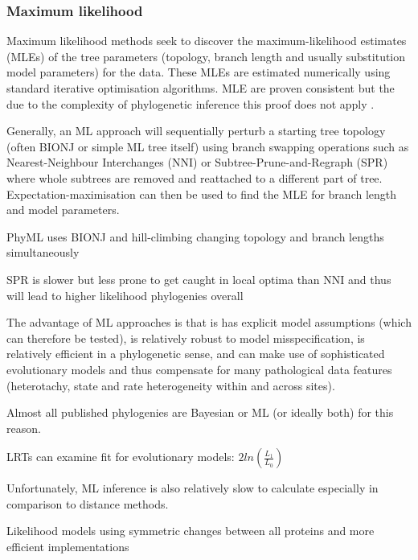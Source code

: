 \subsubsection{Maximum likelihood}

Maximum likelihood methods seek to discover the maximum-likelihood estimates (MLEs) of the tree parameters (topology, branch length and usually substitution model parameters)
for the data. These MLEs are estimated numerically using standard iterative optimisation algorithms.
MLE are proven consistent \citep{Wald1949} but the due to the complexity of phylogenetic inference
this proof does not apply \citep{Yang2012}.

Generally, an ML approach will sequentially perturb a starting tree topology (often BIONJ or simple ML tree itself) 
using branch swapping operations such as Nearest-Neighbour Interchanges (NNI)
or Subtree-Prune-and-Regraph (SPR) where whole subtrees are removed and reattached to a different part of tree. Expectation-maximisation
can then be used to find the MLE for branch length and model parameters.

PhyML uses BIONJ and hill-climbing changing topology and branch lengths simultaneously

SPR is slower but less prone to get caught in local optima than NNI and thus will
lead to higher likelihood phylogenies overall \citep{Criscuolo2011}


The advantage of ML approaches is that is has explicit model assumptions (which can therefore be tested), is relatively robust to model
misspecification, is relatively efficient in a phylogenetic sense, and can make use of sophisticated evolutionary models and thus compensate
for many pathological data features (heterotachy, state and rate heterogeneity within and across sites).

Almost all published phylogenies are Bayesian or ML (or ideally both) for this reason.

LRTs can examine fit for evolutionary models: \(2ln(\frac{L_{1}}{L_{0}})\) \citep{Goldman1987}


Unfortunately, ML inference is also relatively slow to calculate especially in comparison to distance methods.

Likelihood models using symmetric changes between all proteins \citep{neyman1971molecular} and more efficient implementations \citep{Felsenstein1981}



